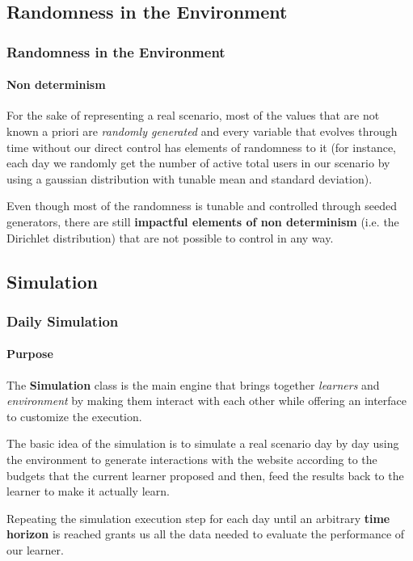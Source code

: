 
\subsection{Randomness in the Environment}


\begin{frame}

\frametitle{Randomness in the Environment}
\framesubtitle{Non determinism}

For the sake of representing a real scenario, most of the values that are not known a priori are \textit{randomly generated} and every variable that evolves through time without our direct control has elements of randomness to it (for instance, each day we randomly get the number of active total users in our scenario by using a gaussian distribution with tunable mean and standard deviation).

Even though most of the randomness is tunable and controlled through seeded generators, there are still \textbf{impactful elements of non determinism} (i.e. the Dirichlet distribution) that are not possible to control in any way.

\end{frame}


\subsection{Simulation}


\begin{frame}

\frametitle{Daily Simulation}
\framesubtitle{Purpose}

The \textbf{Simulation} class is the main engine that brings together \textit{learners} and \textit{environment} by making them interact with each other while offering an interface to customize the execution.

The basic idea of the simulation is to simulate a real scenario day by day using the environment to generate interactions with the website according to the budgets that the current learner proposed and then, feed the results back to the learner to make it actually learn.

Repeating the simulation execution step for each day until an arbitrary \textbf{time horizon} is reached grants us all the data needed to evaluate the performance of our learner.

\end{frame}

